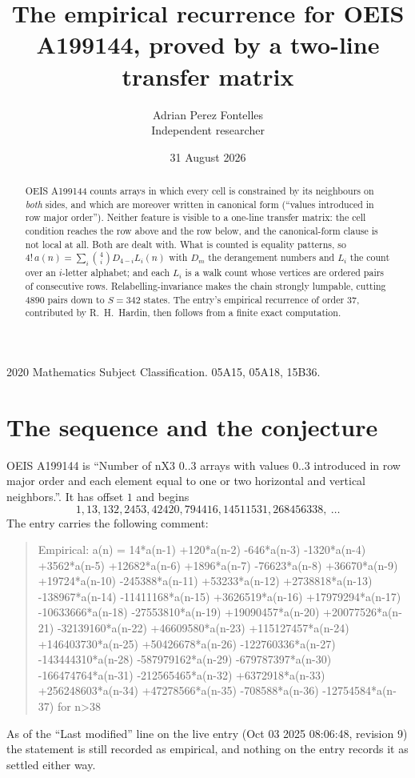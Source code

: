 \documentclass[11pt,a4paper]{article}
\title{The empirical recurrence for OEIS A199144, proved by a two-line transfer matrix}
\author{Adrian Perez Fontelles\\ \small Independent researcher}
\date{31 August 2026}
\theoremstyle{plain}
\theoremstyle{definition}
\begin{document}
\maketitle

\begin{abstract}
OEIS A199144 counts arrays in which every cell is constrained by its neighbours on \emph{both}
sides, and which are moreover written in canonical form (``values introduced in row major
order''). Neither feature is visible to a one-line transfer matrix: the cell condition
reaches the row above and the row below, and the canonical-form clause is not local at
all. Both are dealt with. What is counted is equality patterns, so
$4!\,a(n)=\sum_i\binom{4}{i}D_{4-i}L_i(n)$ with $D_m$ the derangement numbers and
$L_i$ the count over an $i$-letter alphabet; and each $L_i$ is a walk count whose vertices
are ordered pairs of consecutive rows. Relabelling-invariance makes the chain strongly
lumpable, cutting $4890$ pairs down to $S=342$ states. The entry's empirical recurrence of
order $37$, contributed by R.~H.~Hardin, then follows from a finite exact computation.
\end{abstract}

\noindent\small 2020 Mathematics Subject Classification. 05A15, 05A18, 15B36.\normalsize

\section{The sequence and the conjecture}

OEIS A199144 is ``Number of nX3 0..3 arrays with values 0..3 introduced in row major order and each element equal to one or two horizontal and vertical neighbors.''. It has offset $1$ and begins
\[
1, 13, 132, 2453, 42420, 794416, 14511531, 268456338,\ \dots
\]
The entry carries the following comment:
\begin{quote}\small
Empirical: a(n) = 14*a(n-1) +120*a(n-2) -646*a(n-3) -1320*a(n-4) +3562*a(n-5) +12682*a(n-6) +1896*a(n-7) -76623*a(n-8) +36670*a(n-9) +19724*a(n-10) -245388*a(n-11) +53233*a(n-12) +2738818*a(n-13) -138967*a(n-14) -11411168*a(n-15) +3626519*a(n-16) +17979294*a(n-17) -10633666*a(n-18) -27553810*a(n-19) +19090457*a(n-20) +20077526*a(n-21) -32139160*a(n-22) +46609580*a(n-23) +115127457*a(n-24) +146403730*a(n-25) +50426678*a(n-26) -122760336*a(n-27) -143444310*a(n-28) -587979162*a(n-29) -679787397*a(n-30) -166474764*a(n-31) -212565465*a(n-32) +6372918*a(n-33) +256248603*a(n-34) +47278566*a(n-35) -708588*a(n-36) -12754584*a(n-37) for n>38
\end{quote}
As of the ``Last modified'' line on the live entry (Oct 03 2025 08:06:48, revision 9) the statement is
still recorded as empirical, and nothing on the entry records it as settled either way.
\end{document}
